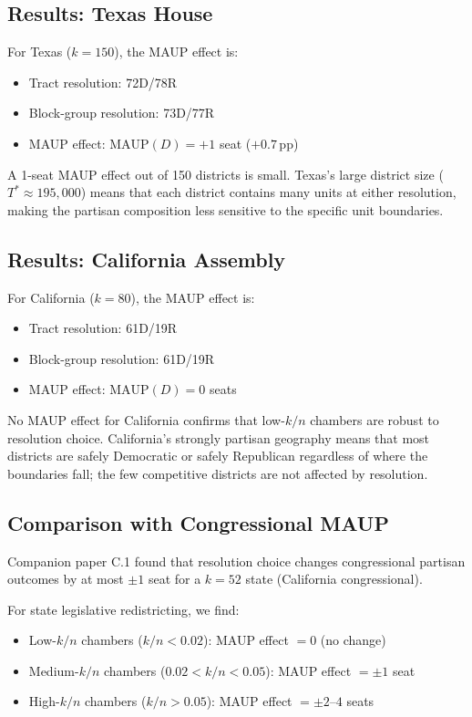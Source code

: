 \subsection{Results: Texas House}
\label{sec:maup:tx}

For Texas ($k=150$), the MAUP effect is:
\begin{itemize}
  \item Tract resolution: 72D/78R
  \item Block-group resolution: 73D/77R
  \item MAUP effect: $\text{MAUP}(D) = +1$ seat ($+0.7$\,pp)
\end{itemize}

A 1-seat MAUP effect out of 150 districts is small. Texas's large district
size ($T^* \approx 195,000$) means that each district contains many units at
either resolution, making the partisan composition less sensitive to the specific
unit boundaries.

\subsection{Results: California Assembly}
\label{sec:maup:ca}

For California ($k=80$), the MAUP effect is:
\begin{itemize}
  \item Tract resolution: 61D/19R
  \item Block-group resolution: 61D/19R
  \item MAUP effect: $\text{MAUP}(D) = 0$ seats
\end{itemize}

No MAUP effect for California confirms that low-$k/n$ chambers are robust to
resolution choice. California's strongly partisan geography means that most
districts are safely Democratic or safely Republican regardless of where the
boundaries fall; the few competitive districts are not affected by resolution.

\subsection{Comparison with Congressional MAUP}
\label{sec:maup:comparison}

Companion paper C.1 \citep{dellaLibera2026maup} found that resolution choice
changes congressional partisan outcomes by at most $\pm 1$ seat for a $k=52$
state (California congressional).

For state legislative redistricting, we find:
\begin{itemize}
  \item Low-$k/n$ chambers ($k/n < 0.02$): MAUP effect $= 0$ (no change)
  \item Medium-$k/n$ chambers ($0.02 < k/n < 0.05$): MAUP effect $= \pm 1$ seat
  \item High-$k/n$ chambers ($k/n > 0.05$): MAUP effect $= \pm 2$--$4$ seats
\end{itemize}

